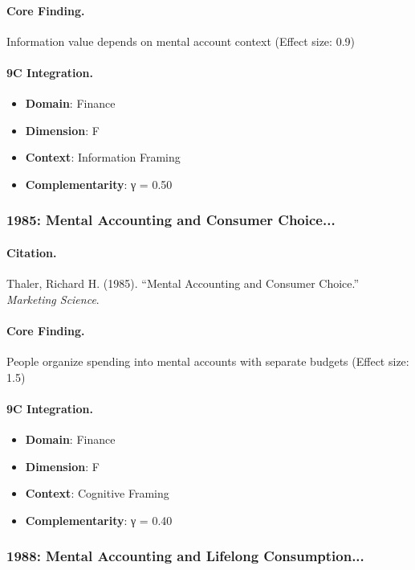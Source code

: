 \paragraph{Core Finding.}
Information value depends on mental account context (Effect size: 0.9)

\paragraph{9C Integration.}
\begin{itemize}[nosep]
  \item \textbf{Domain}: Finance
  \item \textbf{Dimension}: F
  \item \textbf{Context}: Information Framing
  \item \textbf{Complementarity}: γ = 0.50
\end{itemize}

\subsubsection{1985: Mental Accounting and Consumer Choice...}

\paragraph{Citation.}
Thaler, Richard H. (1985). ``Mental Accounting and Consumer Choice.''
\textit{Marketing Science}.

\paragraph{Core Finding.}
People organize spending into mental accounts with separate budgets (Effect size: 1.5)

\paragraph{9C Integration.}
\begin{itemize}[nosep]
  \item \textbf{Domain}: Finance
  \item \textbf{Dimension}: F
  \item \textbf{Context}: Cognitive Framing
  \item \textbf{Complementarity}: γ = 0.40
\end{itemize}

\subsubsection{1988: Mental Accounting and Lifelong Consumption...}

